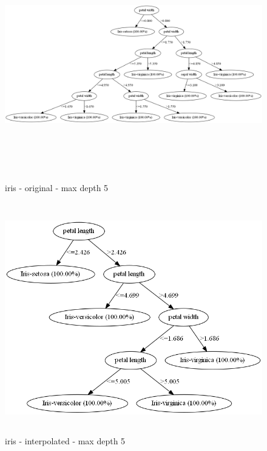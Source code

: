 \documentclass{sig-alternate}
\begin{document}
\clearpage
\begin{figure}[!t]
    \centering
    \includegraphics[width=1.00\textwidth,height=10cm,keepaspectratio]{./images/irisD5Original.png}
    \caption{iris - original - max depth 5}
    \label{figure:irisD5Original}
\end{figure}
\begin{figure}[h]
    \centering
    \includegraphics[width=1.00\textwidth,height=10cm,keepaspectratio]{./images/irisD5New.png}
    \caption{iris - interpolated - max depth 5}
    \label{figure:irisD5New}
\end{figure}
\end{document}
